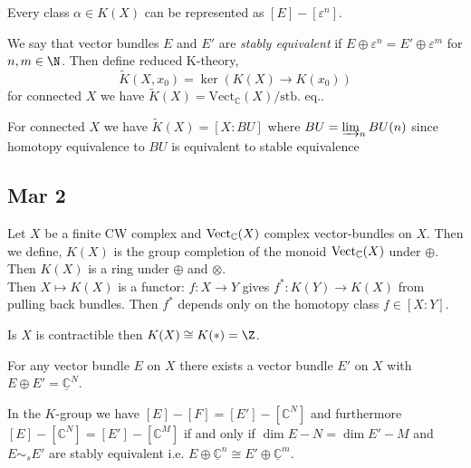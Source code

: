 \documentclass[12pt]{extarticle}
\begin{document}
\begin{prop}
Every class $\alpha \in K(X)$ can be represented as $[E] - [\varepsilon^n]$. 
\end{prop}

\begin{prop}

\end{prop}

\newcommand{\C}{\mathbb{C}}

\begin{defn}
We say that vector bundles $E$ and $E'$ are \textit{stably equivalent} if $E \oplus \varepsilon^n = E' \oplus \varepsilon^{m}$ for $n,m \in \N$. Then define reduced K-theory,
\[ \tilde{K}(X, x_0) = \ker{(K(X) \to K(x_0))} \]
for connected $X$ we have $\tilde{K}(X) = \mathrm{Vect}_{\C}(X) / \text{stb. eq.}$. 
\end{defn}

\begin{prop}
For connected $X$ we have $\tilde{K}(X) = [X : BU]$ where $BU = \varinjlim_{n} BU(n)$ since homotopy equivalence to $BU$ is equivalent to stable equivalence 
\end{prop}

\subsection{Mar 2}

Let $X$ be a finite CW complex and $\Vect_\C(X)$ complex vector-bundles on $X$. Then we define,  $K(X)$ is the group completion of the monoid $\Vect_{\C}(X)$ under $\oplus$. Then $K(X)$ is a ring under $\oplus$ and $\otimes$.
\bigskip\\
Then $X \mapsto K(X)$ is a functor: $f : X \to Y$ gives $f^* : K(Y) \to K(X)$ from pulling back bundles. Then $f^*$ depends only on the homotopy class $f \in [X : Y]$.
\bigskip\\
\begin{rmk}
Is $X$ is contractible then $K(X) \cong K(*) = \Z$.
\end{rmk}

\begin{prop}
For any vector bundle $E$ on $X$ there exists a vector bundle $E'$ on $X$ with $E \oplus E' = \underline{\C}^{N}$. 
\end{prop}

\begin{cor}
In the $K$-group we have $[E] - [F] = [E'] - [\C^N]$ and furthermore $[E] - [\C^N] = [E'] - [\C^M]$ if and only if $\dim{E} - N = \dim{E'} - M$ and $E \sim_s E'$ are stably equivalent i.e. $E \oplus \underline{\C}^n \cong E' \oplus \underline{\C}^m$.  
\end{cor}
\end{document}
